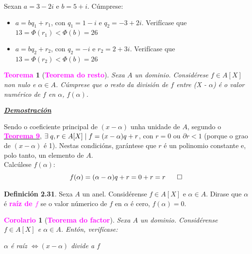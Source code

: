 \documentclass[twoside]{report}
\newcommand{\magbf}[1]{\textcolor{magenta}{\textbf{#1}}} %
\theoremstyle{mystyle}
\newtheorem{theo}{\magbf{Teorema}}[chapter]
\newtheorem{cor}{\magbf{Corolario}}[chapter]
\newenvironment{theorem}
{\begin{mdframed}[linecolor = magenta,backgroundcolor = classicrose, linewidth = 2mm]\begin{theo}}
{\end{theo}\end{mdframed}}
\newenvironment{corollary}
{\begin{mdframed}[linecolor = magenta,backgroundcolor = classicrose, linewidth = 2mm]\begin{cor}}
{\end{cor}\end{mdframed}}
\begin{document}
\noindent Sexan $a = 3 - 2i$ e $b = 5 + i$. Cúmprese:

\begin{itemize}
    \item $a = bq_{1} + r_{1}$, con $q_{1} = 1 - i$ e $q_{2} = -3 + 2i$. Verifícase que $13 = \Phi(r_{1}) < \Phi(b) = 26$
    \item $a = bq_{2} + r_{2}$, con $q_{2} = -i$ e $r_{2} = 2 + 3i$. Verifícase que $13 = \Phi(r_{2}) < \Phi(b) = 26$
\end{itemize}

\vspace{3mm}

\begin{theorem}[\magbf{Teorema do resto}] \label{th2.10}
Sexa $A$ un dominio. Considérese $f \in A[X]$ non nulo e $\alpha \in A$. Cúmprese que o resto da división de $f$ entre (X - $\alpha$) é o valor numérico de $f$ en $\alpha$, $f(\alpha)$.
\end{theorem}

\vspace{2mm}

\noindent \textbf{\textit{\underline{Demostración}}}

\vspace{2mm}

\noindent Sendo o coeficiente principal de $(x-\alpha)$ unha unidade de $A$, segundo o \hyperref[th2.9]{\magbf{Teorema 9}}, $\exists \hspace{1mm} q,r \in A[X] \hspace{1mm} | \hspace{1mm} f = (x-\alpha)q + r$, con $r = 0$ ou $\partial r < 1$ (porque o grao de $(x-\alpha)$ é 1). Nestas condicións, garántese que $r$ é un polinomio constante e, polo tanto, un elemento de $A$.\\

\noindent Calcúlese $f(\alpha)$:
$$f(\alpha) = (\alpha - \alpha)q + r = 0 + r = r \hspace{6mm} \square\\$$

\vspace{3mm}

\noindent \textbf{Definición 2.31}. Sexa $A$ un anel. Considérense $f \in A[X]$ e $\alpha \in A$. Dirase que $\alpha$ é \magbf{raíz de $f$} se o valor númerico de $f$ en $\alpha$ é cero, $f(\alpha) = 0$.\\

\begin{corollary}[\magbf{Teorema do factor}] \label{cor2.6}
Sexa $A$ un dominio. Considérense $f \in A[X]$ e $\alpha \in A$. Entón, verifícase:
\begin{center}
    $\alpha$ é raíz $\Longleftrightarrow (x-\alpha)$ divide a $f$
\end{center}
\end{corollary}
\end{document}
